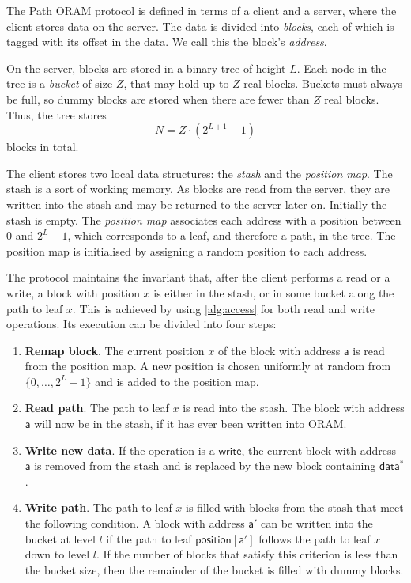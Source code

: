 \documentclass[12pt,a4paper,twoside,openright]{report}
\begin{document}
The Path ORAM protocol is defined in terms of a client and a server, where the client stores data on the server. The data is divided into \emph{blocks}, each of which is tagged with its offset in the data. We call this the block's \emph{address}.

On the server, blocks are stored in a binary tree of height $L$. Each node in the tree is a \emph{bucket} of size $Z$, that may hold up to $Z$ real blocks. Buckets must always be full, so dummy blocks are stored when there are fewer than $Z$ real blocks. Thus, the tree stores $$N = Z \cdot (2^{L+1} - 1)$$ blocks in total.

The client stores two local data structures: the \emph{stash} and the \emph{position map}. The stash is a sort of working memory. As blocks are read from the server, they are written into the stash and may be returned to the server later on. Initially the stash is empty. The \emph{position map} associates each address with a position between $0$ and $2^L-1$, which corresponds to a leaf, and therefore a path, in the tree. The position map is initialised by assigning a random position to each address.

The protocol maintains the invariant that, after the client performs a read or a write, a block with position $x$ is either in the stash, or in some bucket along the path to leaf $x$. This is achieved by using \cref{alg:access} for both read and write operations. Its execution can be divided into four steps:

\begin{enumerate}
    \item \textbf{Remap block}. The current position $x$ of the block with address $\mathsf{a}$ is read from the position map. A new position is chosen uniformly at random from $\{0,\dots,2^L-1\}$ and is added to the position map.
    \item \textbf{Read path}. The path to leaf $x$ is read into the stash. The block with address $\mathsf{a}$ will now be in the stash, if it has ever been written into ORAM.
    \item \textbf{Write new data}. If the operation is a $\mathsf{write}$, the current block with address $\mathsf{a}$ is removed from the stash and is replaced by the new block containing $\mathsf{data^\ast}$.
    \item \textbf{Write path}. The path to leaf $x$ is filled with blocks from the stash that meet the following condition. A block with address $\mathsf{a'}$ can be written into the bucket at level $l$ if the path to leaf $\mathsf{position[a']}$ follows the path to leaf $x$ down to level $l$. If the number of blocks that satisfy this criterion is less than the bucket size, then the remainder of the bucket is filled with dummy blocks.
\end{enumerate}
\end{document}
